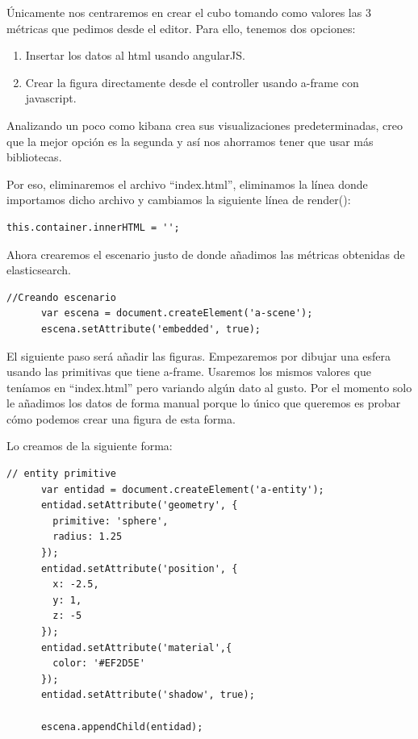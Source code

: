 \documentclass[a4paper, 12pt]{book}
\begin{document}
Únicamente nos centraremos en crear el cubo tomando como valores las 3 métricas que pedimos desde el editor. Para ello, tenemos dos opciones:
\begin{enumerate}
    \item Insertar los datos al html usando angularJS.
    \item Crear la figura directamente desde el controller usando a-frame con javascript.
\end{enumerate}
Analizando un poco como kibana crea sus visualizaciones predeterminadas, creo que la mejor opción es la segunda y así nos ahorramos tener que usar más bibliotecas.

Por eso, eliminaremos el archivo “index.html”, eliminamos la línea donde importamos dicho archivo y cambiamos la siguiente línea de render():

\begin{lstlisting}[frame=single]
    this.container.innerHTML = '';
\end{lstlisting}

Ahora crearemos el escenario justo de donde añadimos las métricas obtenidas de elasticsearch.

\begin{lstlisting}[frame=single]
     //Creando escenario
      var escena = document.createElement('a-scene');
      escena.setAttribute('embedded', true);
\end{lstlisting}

El siguiente paso será añadir las figuras. Empezaremos por dibujar una esfera usando las primitivas que tiene a-frame. Usaremos los mismos valores que teníamos en “index.html” pero variando algún dato al gusto. Por el momento solo le añadimos los datos de forma manual porque lo único que queremos es probar cómo podemos crear una figura de esta forma.

Lo creamos de la siguiente forma:

\begin{lstlisting}[frame=single]
     // entity primitive
      var entidad = document.createElement('a-entity');
      entidad.setAttribute('geometry', {
        primitive: 'sphere',
        radius: 1.25
      });
      entidad.setAttribute('position', {
        x: -2.5,
        y: 1,
        z: -5
      });
      entidad.setAttribute('material',{
        color: '#EF2D5E'
      });
      entidad.setAttribute('shadow', true);

      escena.appendChild(entidad);
\end{lstlisting}
\end{document}

